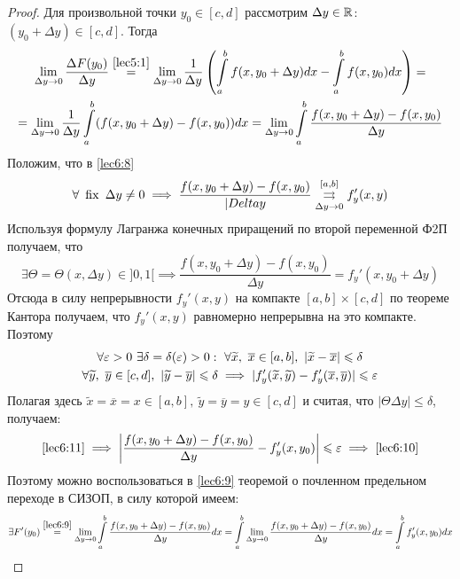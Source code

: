 \documentclass[../../main.tex]{subfiles}
\begin{document}
\begin{proof}
	Для произвольной точки $ y_0 \in [c, d] $ рассмотрим $ \Delta y \in \mathbb{R} $:
	$ (y_0 + \Delta y) \in [c, d] $. Тогда 
	\begin{equation}
	\begin{gathered}
		\lim\limits_{\Delta y \to 0} \dfrac{\Delta F(y_0)}{\Delta y} 
		\stackrel{\eqref{lec5:1}}{=} \lim\limits_{\Delta y \to 0}
		\dfrac{1}{\Delta y} \left(
		\int\limits_a^b f(x, y_0 + \Delta y) dx - \int\limits_a^b f(x, y_0) dx
		\right) = \\
		\label{lec6:9} =
		\lim\limits_{\Delta y \to 0} \dfrac{1}{\Delta y}
		\int\limits_a^b (f(x, y_0 + \Delta y) - f(x, y_0)) dx = 
		\lim\limits_{\Delta y \to 0}\int\limits_a^b
		\dfrac{f(x, y_0 + \Delta y) - f(x, y_0)}{\Delta y}
	\end{gathered}
	\end{equation}
	Положим, что в \eqref{lec6:8} 
	\begin{equation}
	\label{lec6:10} 
	\forall\ \operatorname{fix} \ \Delta y \neq 0 \implies
	\dfrac{f(x, y_0 + \Delta y) - f(x, y_0)}{|Delta y} 
	\stackrel{[a, b]}{\underset{\Delta y \to 0}{\rightrightarrows}} f_y'(x, y)
	\end{equation}
	Используя формулу Лагранжа конечных приращений по второй переменной 
	Ф2П получаем, что 
	\[ 
	\exists \Theta = \Theta(x, \Delta y) \in ]0, 1[ 
	\implies \dfrac{f(x, y_0 + \Delta y) - f(x, y_0)}{\Delta y} = 
	f_y'(x, y_0 + \Delta y)
	\]
	Отсюда в силу непрерывности $ f_y'(x, y) $ на компакте $ [a, b] \times 
	[c, d] $ по теореме Кантора получаем, что $ f_y'(x, y) $ равномерно
	непрерывна на это компакте. Поэтому
	\begin{equation}
		\begin{gathered}
		\forall \eps > 0 \ \exists \delta = \delta(\eps) > 0: \ 
		\forall \widetilde{x},\ \overline{x} \in [a, b],\ 
		|\widetilde{x} - \overline{x}| \leq \delta \\
		\label{lec6:11}
		\forall \widetilde{y},\ \overline{y} \in [c, d],\
		|\widetilde{y} - \overline{y}| \leq \delta \implies
		|f_y'(\widetilde{x}, \widetilde{y}) - f_y'(\overline{x}, \overline{y})|
		\leq \eps
		\end{gathered}
	\end{equation}
	Полагая здесь $ \widetilde{x} = \overline{x} = x \in [a, b],\ 
	\widetilde{y} = \overline{y} = y \in [c, d]	$ и считая, что 
	$ |\Theta\Delta y| \leq \delta $, получаем:
	\[
	\eqref{lec6:11} \implies\left|
	\dfrac{f(x, y_0 + \Delta y) - f(x, y_0)}{\Delta y} - f_y'(x, y_0)
	\right| \leqslant \varepsilon \implies \eqref{lec6:10}
	\]
	Поэтому можно воспользоваться в \eqref{lec6:9} теоремой о почленном 
	предельном переходе в СИЗОП, в силу которой имеем:
	\[
	\exists F'(y_0) \stackrel{\eqref{lec6:9}}{=} \lim\limits_{\Delta y \to 0}
	\int\limits_a^b \dfrac{f(x, y_0 + \Delta y) - f(x, y_0)}{\Delta y} dx =
	\int\limits_a^b \lim\limits_{\Delta y \to 0} 
	\dfrac{f(x, y_0 + \Delta y) - f(x, y_0)}{\Delta y} dx = 
	\int\limits_a^b f_y'(x, y_0) dx	
	\]
\end{proof}
\end{document}
